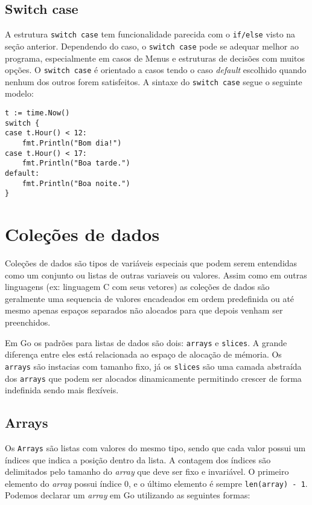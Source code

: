 \documentclass{SBCbookchapter}
\begin{document}
\subsection{Switch case}

A estrutura \texttt{switch case} tem funcionalidade parecida com o \texttt{if/else} visto na seção anterior. Dependendo do caso, o \texttt{switch case} pode se adequar melhor ao programa, especialmente em casos de Menus e estruturas de decisões com muitos opções. O \texttt{switch case} é orientado a casos tendo o caso \textit{default} escolhido quando nenhum dos outros forem satisfeitos. A sintaxe do \texttt{switch case} segue o seguinte modelo:
	
\begin{lstlisting}
t := time.Now()
switch {
case t.Hour() < 12:
   	fmt.Println("Bom dia!")
case t.Hour() < 17:
   	fmt.Println("Boa tarde.")
default:
   	fmt.Println("Boa noite.")
}
\end{lstlisting}

\section{Coleções de dados}

Coleções de dados são tipos de variáveis especiais que podem serem entendidas como um conjunto ou listas de outras variaveis ou valores. Assim como em outras linguagens (ex: linguagem C com seus vetores) as coleções de dados são geralmente uma sequencia de valores encadeados em ordem predefinida ou até mesmo apenas espaços separados não alocados para que depois venham ser preenchidos.


Em Go os padrões para listas de dados são dois: \texttt{arrays} e \texttt{slices}. A grande diferença entre eles está relacionada ao espaço de alocação de mémoria. Os \texttt{arrays} são instacias com tamanho fixo, já os \texttt{slices} são uma camada abstraída dos \texttt{arrays} que podem ser alocados dinamicamente permitindo crescer de forma indefinida sendo mais flexíveis.

\subsection{Arrays}

Os \texttt{Arrays} são listas com valores do mesmo tipo, sendo que cada valor possui um índices que indica a posição dentro da lista. A contagem dos índices são delimitados pelo tamanho do \textit{array} que deve ser fixo e invariável. O primeiro elemento do \textit{array} possui índice 0, e o último elemento é sempre \texttt{len(array) - 1}. Podemos declarar um \textit{array} em Go utilizando as seguintes formas:
\end{document}
